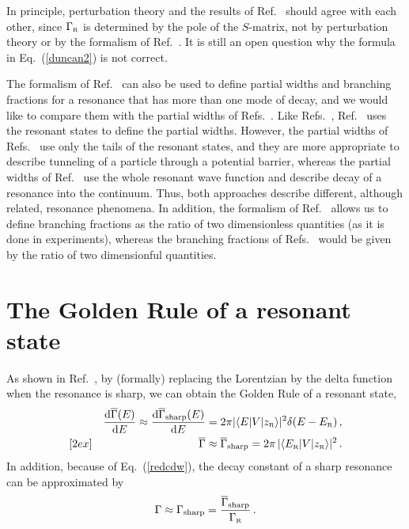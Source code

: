 \documentclass[12pt]{article}
\newcommand{\rmd}{{\rm d}}
\newcommand{\gs}{|z_{\text{\tiny R}}\rangle}
\newcommand{\gr}{\Gamma _{\text{\tiny R}}}
\newcommand{\er}{E_{\text{\tiny R}}}
\begin{document}
In principle, perturbation theory and the results of Ref.~\cite{NPA15} should
agree with each other, since $\gr$ is determined by the pole
of the $S$-matrix, not by perturbation theory or by
the formalism of Ref.~\cite{NPA15}. It is still an open question why the 
formula in Eq.~(\ref{duncan2}) is not correct.

The formalism of Ref.~\cite{NPA15} can also be used to define partial widths
and branching fractions for a resonance that has more than one mode of
decay, and we would like to compare them with the partial widths of
Refs.~\cite{PESKIN,GASTON10}. Like Refs.~\cite{PESKIN,GASTON10},
Ref.~\cite{NPA15} uses the resonant states to define the
partial widths. However, the partial widths of Refs.~\cite{PESKIN,GASTON10}
use only the tails of the resonant states, and they are more appropriate
to describe tunneling of a particle through a potential barrier, whereas 
the partial widths of Ref.~\cite{NPA15} use the whole resonant wave
function and describe decay of a resonance into the continuum. Thus, both
approaches describe different, although related, resonance phenomena. In 
addition, the formalism of Ref.~\cite{NPA15} allows us to define branching
fractions as the ratio of two dimensionless quantities (as it is done
in experiments), whereas the branching fractions of 
Refs.~\cite{PESKIN,GASTON10} would be given by the ratio of two dimensionful
quantities.













\section{The Golden Rule of a resonant state}
\setcounter{equation}{0}
\label{sec:goldernue}


As shown in Ref.~\cite{NPA15}, by (formally) replacing the Lorentzian
by the delta function when the resonance is sharp, we can obtain the
Golden Rule of a resonant state,
\begin{eqnarray}
    && \frac{\rmd \overline{\Gamma} (E)}{\rmd E}\approx
       \frac{\rmd \overline{\Gamma}_{\rm sharp} (E)}{\rmd E} =
 2\pi 
         |\langle E|V \gs|^2 \delta (E-\er) \, , 
         \label{inteGam8} \\ [2ex]
    && \overline{\Gamma} \approx   \overline{\Gamma}_{\rm sharp}=
          2\pi  \,  
         |\langle \er |V \gs|^2  \, . 
         \label{inteGam9}
\end{eqnarray}
In addition, because of Eq.~(\ref{redcdw}), the 
decay constant of a sharp resonance can be approximated by
\begin{equation}
       \Gamma \approx 
      \Gamma _{\rm sharp}= \frac{\overline{\Gamma}_{\rm sharp}}{\gr} \, .
        \label{gammasharp}
\end{equation}
\end{document}

